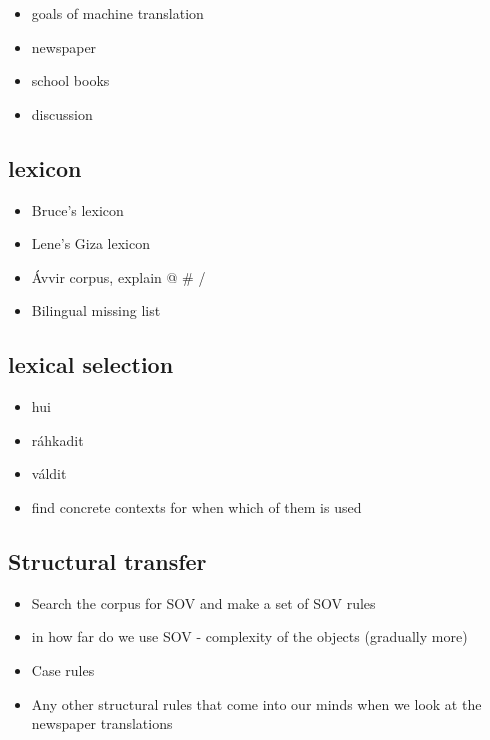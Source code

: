 \documentclass[a4paper,english,12pt]{article}
\begin{document}
\begin{itemize}
\item goals of machine translation
\item newspaper 
\item school books
\item discussion
\end{itemize}

\subsection{lexicon}
\begin{itemize}
\item Bruce's lexicon
\item Lene's Giza lexicon
\item Ávvir corpus, explain @ \# /
\item Bilingual missing list
\end{itemize}

\subsection{lexical selection}
\begin{itemize}
\item hui
\item ráhkadit
\item váldit
\item find concrete contexts for when which of them is used
\end{itemize}

\subsection{Structural transfer} 

\begin{itemize}
\item Search the corpus for SOV and make a set of SOV rules
\item in how far do we use SOV - complexity of the objects (gradually more)
\item Case rules
\item Any other structural rules that come into our minds when we look at the newspaper translations
\end{itemize}
\end{document}

